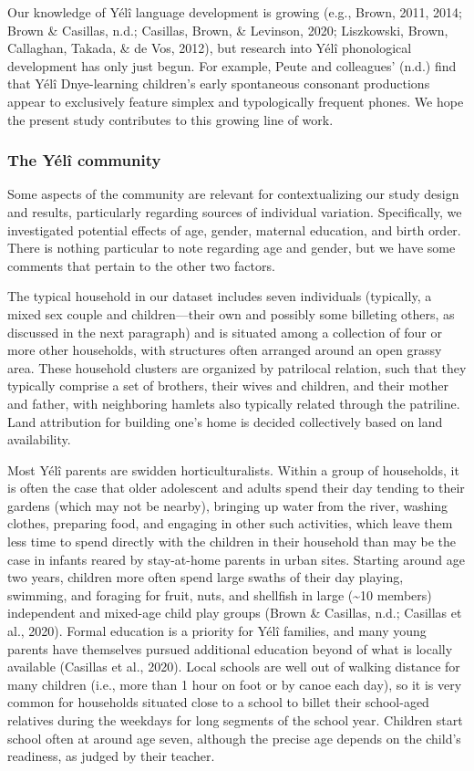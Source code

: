 \documentclass[english,,man,floatsintext]{apa6}
\begin{document}
Our knowledge of Yélî language development is growing (e.g., Brown, 2011, 2014; Brown \& Casillas, n.d.; Casillas, Brown, \& Levinson, 2020; Liszkowski, Brown, Callaghan, Takada, \& de Vos, 2012), but research into Yélî phonological development has only just begun. For example, Peute and colleagues' (n.d.) find that Yélî Dnye-learning children's early spontaneous consonant productions appear to exclusively feature simplex and typologically frequent phones. We hope the present study contributes to this growing line of work.

\hypertarget{the-yuxe9luxee-community}{%
\subsubsection{The Yélî community}\label{the-yuxe9luxee-community}}

Some aspects of the community are relevant for contextualizing our study design and results, particularly regarding sources of individual variation. Specifically, we investigated potential effects of age, gender, maternal education, and birth order. There is nothing particular to note regarding age and gender, but we have some comments that pertain to the other two factors.

The typical household in our dataset includes seven individuals (typically, a mixed sex couple and children---their own and possibly some billeting others, as discussed in the next paragraph) and is situated among a collection of four or more other households, with structures often arranged around an open grassy area. These household clusters are organized by patrilocal relation, such that they typically comprise a set of brothers, their wives and children, and their mother and father, with neighboring hamlets also typically related through the patriline. Land attribution for building one's home is decided collectively based on land availability.

Most Yélî parents are swidden horticulturalists. Within a group of households, it is often the case that older adolescent and adults spend their day tending to their gardens (which may not be nearby), bringing up water from the river, washing clothes, preparing food, and engaging in other such activities, which leave them less time to spend directly with the children in their household than may be the case in infants reared by stay-at-home parents in urban sites. Starting around age two years, children more often spend large swaths of their day playing, swimming, and foraging for fruit, nuts, and shellfish in large (\textasciitilde{}10 members) independent and mixed-age child play groups (Brown \& Casillas, n.d.; Casillas et al., 2020). Formal education is a priority for Yélî families, and many young parents have themselves pursued additional education beyond of what is locally available (Casillas et al., 2020). Local schools are well out of walking distance for many children (i.e., more than 1 hour on foot or by canoe each day), so it is very common for households situated close to a school to billet their school-aged relatives during the weekdays for long segments of the school year. Children start school often at around age seven, although the precise age depends on the child's readiness, as judged by their teacher.
\end{document}
